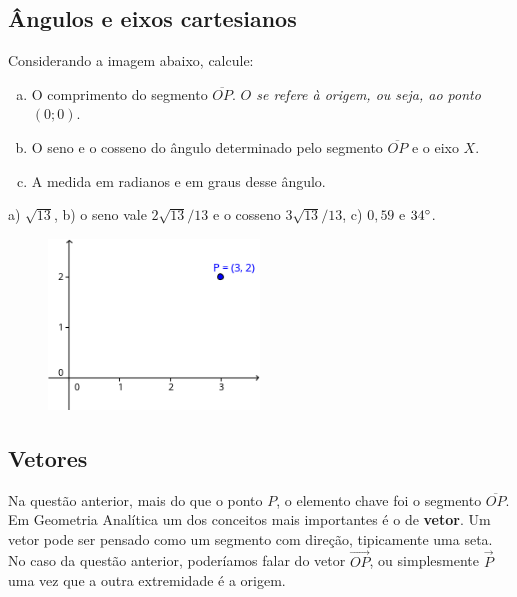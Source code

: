 \documentclass[main.tex]{subfiles}
\begin{document}
\subsection*{Ângulos e eixos cartesianos}

\begin{questao}
Considerando a imagem abaixo, calcule:
\begin{enumerate}[a)]
\item O comprimento do segmento $\overline{OP}$. \textit{$O$ se refere à origem, ou seja, ao ponto $(0;0)$}.
\item O seno e o cosseno do ângulo determinado pelo segmento $\overline{OP}$ e o eixo $X$. 
\item A medida em radianos e em graus desse ângulo.
\end{enumerate}
\end{questao}

\begin{gabarito}
	\begin{gabaritoQuestao}
		a) $\sqrt{13}$, b) o seno vale $2\sqrt{13}/13$ e o cosseno $3\sqrt{13}/13$, c) $0,59$ e $34\degree$.
	\end{gabaritoQuestao}
\end{gabarito}

\begin{figure}[h]
\centering
\includegraphics[width=0.5\textwidth]{./img/c4q5.png}
\end{figure}

\subsection*{Vetores}

Na questão anterior, mais do que o ponto $P$, o elemento chave foi o segmento $\overline{OP}$. Em Geometria Analítica um dos conceitos mais importantes é o de \textbf{vetor}. Um vetor pode ser pensado como um segmento com direção, tipicamente uma seta. No caso da questão anterior, poderíamos falar do vetor $\overrightarrow{OP}$, ou simplesmente $\overrightarrow{P}$ uma vez que a outra extremidade é a origem.
\end{document}
